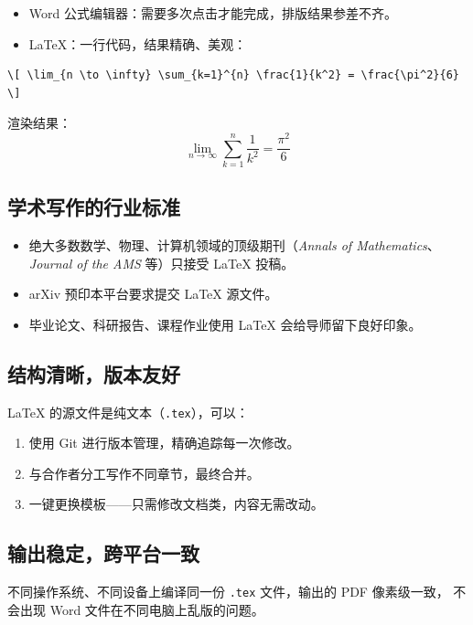 \documentclass[12pt, a4paper]{article}
\begin{document}
\begin{itemize}
    \item Word 公式编辑器：需要多次点击才能完成，排版结果参差不齐。
    \item \LaTeX{}：一行代码，结果精确、美观：
\end{itemize}

\begin{lstlisting}
\[ \lim_{n \to \infty} \sum_{k=1}^{n} \frac{1}{k^2} = \frac{\pi^2}{6} \]
\end{lstlisting}

渲染结果：
\[
    \lim_{n \to \infty} \sum_{k=1}^{n} \frac{1}{k^2} = \frac{\pi^2}{6}
\]

\subsection{学术写作的行业标准}

\begin{itemize}
    \item 绝大多数数学、物理、计算机领域的顶级期刊（\textit{Annals of Mathematics}、
          \textit{Journal of the AMS} 等）只接受 \LaTeX{} 投稿。
    \item arXiv 预印本平台要求提交 \LaTeX{} 源文件。
    \item 毕业论文、科研报告、课程作业使用 \LaTeX{} 会给导师留下良好印象。
\end{itemize}

\subsection{结构清晰，版本友好}

\LaTeX{} 的源文件是纯文本（\texttt{.tex}），可以：
\begin{enumerate}
    \item 使用 Git 进行版本管理，精确追踪每一次修改。
    \item 与合作者分工写作不同章节，最终合并。
    \item 一键更换模板——只需修改文档类，内容无需改动。
\end{enumerate}

\subsection{输出稳定，跨平台一致}

不同操作系统、不同设备上编译同一份 \texttt{.tex} 文件，输出的 PDF 像素级一致，
不会出现 Word 文件在不同电脑上乱版的问题。
\end{document}
